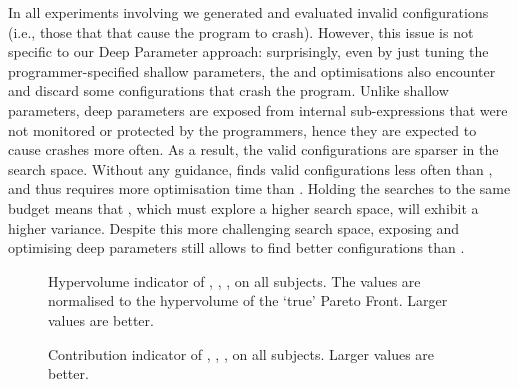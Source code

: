 In all experiments involving \dr{} we generated and evaluated invalid
configurations (i.e., those that that cause the program to crash). However,
this issue is not specific to our Deep Parameter approach: 
surprisingly, even by just tuning the programmer-specified shallow parameters, 
the \sr{} and \sn{} optimisations also encounter and discard some
configurations that crash the program.
Unlike shallow parameters, deep parameters are exposed from internal
sub-expressions that were not monitored or protected by the programmers,
hence they are expected to cause crashes more often. As a result, the valid
configurations are sparser in the search space. Without any guidance, \dr{}
finds valid configurations less often than \sr{}, and thus requires more
optimisation time than \sr{}. Holding the searches to the same budget means
that \dn{}, which must explore a higher search space, will exhibit a higher
variance. 
Despite this more challenging search space, exposing and optimising deep
parameters still allows \dn{} to find better configurations
than \sn{}.
 
\begin{figure}[htbp]
	\centering
	\caption{Hypervolume indicator of \sr{}, \sn{}, \dr{}, \dn{} on all subjects. The values are normalised to the hypervolume of the `true' Pareto Front. Larger values are better.}\label{fig_hypervolume}
\end{figure}

\begin{figure}[htbp]
	\centering
	\caption{Contribution indicator of \sr{}, \sn{}, \dr{}, \dn{} on all subjects. Larger values are better.}\label{fig_contribution}
\end{figure}

